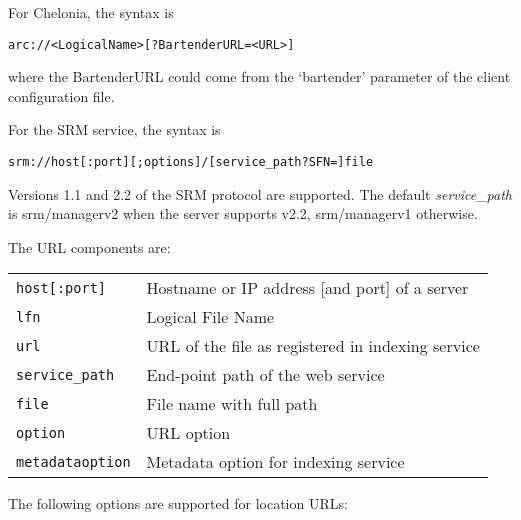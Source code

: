 For Chelonia, the syntax is
\begin{shaded}
    \verb#arc://<LogicalName>[?BartenderURL=<URL>]#
\end{shaded}
where the BartenderURL could come from the `bartender' parameter of the client configuration file.

For the SRM service, the syntax is
\begin{shaded}
   \verb#srm://host[:port][;options]/[service_path?SFN=]file#
\end{shaded}

Versions 1.1 and 2.2 of the SRM protocol are supported. The
default \emph{service\_path} is srm/managerv2 when the server supports
v2.2, srm/managerv1 otherwise.

The URL components are:

\begin{tabular}{lp{10cm}}
   \verb#host[:port]# & Hostname or IP address [and port] of a server\\
   \verb#lfn# & Logical File Name\\
   \verb#url# & URL of the file as registered in indexing service\\
   \verb#service_path# & End-point path of the web service\\
   \verb#file# & File name with full path\\
   \verb#option# & URL option\\
   \verb#metadataoption# & Metadata option for indexing service\\
\end{tabular}

The following options are supported for location URLs:

